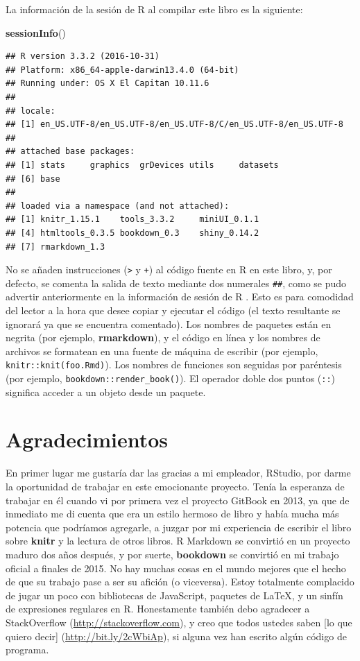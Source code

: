 \documentclass[12pt,]{krantz}
\makeatletter
\newenvironment{Shaded}{\begin{snugshade}}{\end{snugshade}}
\newcommand{\KeywordTok}[1]{\textcolor[rgb]{0.13,0.29,0.53}{\textbf{{#1}}}}
\newcommand{\NormalTok}[1]{{#1}}
\newenvironment{kframe}{%
\medskip{}
\setlength{\fboxsep}{.8em}
 \def\at@end@of@kframe{}%
 \ifinner\ifhmode%
  \def\at@end@of@kframe{\end{minipage}}%
  \begin{minipage}{\columnwidth}%
 \fi\fi%
 \def\FrameCommand##1{\hskip\@totalleftmargin \hskip-\fboxsep
 \colorbox{shadecolor}{##1}\hskip-\fboxsep
     \hskip-\linewidth \hskip-\@totalleftmargin \hskip\columnwidth}%
 \MakeFramed {\advance\hsize-\width
   \@totalleftmargin\z@ \linewidth\hsize
   \@setminipage}}%
 {\par\unskip\endMakeFramed%
 \at@end@of@kframe}
\renewenvironment{Shaded}{\begin{kframe}}{\end{kframe}}
\theoremstyle{definition}
\theoremstyle{definition}
\theoremstyle{remark}
\makeatother
\begin{document}
La información de la sesión de R al compilar este libro es la siguiente:

\begin{Shaded}
\begin{Highlighting}[]
\KeywordTok{sessionInfo}\NormalTok{()}
\end{Highlighting}
\end{Shaded}

\begin{verbatim}
## R version 3.3.2 (2016-10-31)
## Platform: x86_64-apple-darwin13.4.0 (64-bit)
## Running under: OS X El Capitan 10.11.6
## 
## locale:
## [1] en_US.UTF-8/en_US.UTF-8/en_US.UTF-8/C/en_US.UTF-8/en_US.UTF-8
## 
## attached base packages:
## [1] stats     graphics  grDevices utils     datasets 
## [6] base     
## 
## loaded via a namespace (and not attached):
## [1] knitr_1.15.1    tools_3.3.2     miniUI_0.1.1   
## [4] htmltools_0.3.5 bookdown_0.3    shiny_0.14.2   
## [7] rmarkdown_1.3
\end{verbatim}

No se añaden instrucciones (\texttt{\textgreater{}} y \texttt{+}) al
código fuente en R en este libro, y, por defecto, se comenta la salida
de texto mediante dos numerales \texttt{\#\#}, como se pudo advertir
anteriormente en la información de sesión de R . Esto es para comodidad
del lector a la hora que desee copiar y ejecutar el código (el texto
resultante se ignorará ya que se encuentra comentado). Los nombres de
paquetes están en negrita (por ejemplo, \textbf{rmarkdown}), y el código
en línea y los nombres de archivos se formatean en una fuente de máquina
de escribir (por ejemplo,
\texttt{knitr::knit(\textquotesingle{}foo.Rmd\textquotesingle{})}). Los
nombres de funciones son seguidas por paréntesis (por ejemplo,
\texttt{bookdown::render\_book()}). El operador doble dos puntos
(\texttt{::}) significa acceder a un objeto desde un paquete.

\section*{Agradecimientos}\label{agradecimientos}


En primer lugar me gustaría dar las gracias a mi empleador, RStudio, por
darme la oportunidad de trabajar en este emocionante proyecto. Tenía la
esperanza de trabajar en él cuando vi por primera vez el proyecto
GitBook en 2013, ya que de inmediato me di cuenta que era un estilo
hermoso de libro y había mucha más potencia que podríamos agregarle, a
juzgar por mi experiencia de escribir el libro sobre \textbf{knitr}
\citep{xie2015} y la lectura de otros libros. R Markdown se convirtió en
un proyecto maduro dos años después, y por suerte, \textbf{bookdown} se
convirtió en mi trabajo oficial a finales de 2015. No hay muchas cosas
en el mundo mejores que el hecho de que su trabajo pase a ser su afición
(o viceversa). Estoy totalmente complacido de jugar un poco con
bibliotecas de JavaScript, paquetes de LaTeX, y un sinfín de expresiones
regulares en R. Honestamente también debo agradecer a StackOverflow
(\url{http://stackoverflow.com}), y creo que todos ustedes saben {[}lo
que quiero decir{]} (\url{http://bit.ly/2cWbiAp}), si alguna vez han
escrito algún código de programa.
\end{document}
